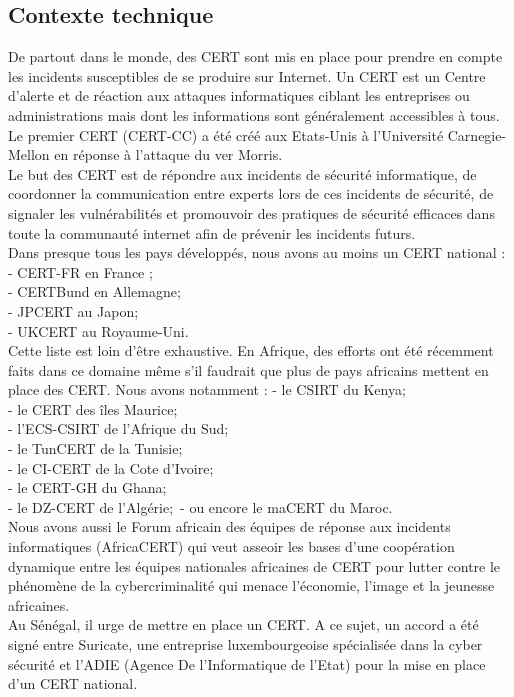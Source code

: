 \subsection{Contexte technique}
De partout dans le monde, des CERT sont mis en place pour prendre en compte les incidents susceptibles de se produire sur Internet. Un CERT est un Centre d’alerte et de réaction aux attaques informatiques ciblant les entreprises ou administrations mais dont les informations sont généralement accessibles à tous. Le premier CERT (CERT-CC) a été créé aux Etats-Unis à l’Université Carnegie-Mellon en réponse à l’attaque du ver Morris. \\
Le but des CERT est de répondre aux incidents de sécurité informatique, de coordonner la communication entre experts lors de ces incidents de sécurité, de signaler les vulnérabilités et promouvoir des pratiques de sécurité efficaces dans toute la communauté internet afin de prévenir les incidents futurs. \\
Dans presque tous les pays développés, nous avons au moins un CERT national : \\
- CERT-FR en France ; \\
- CERTBund en Allemagne; \\ 
- JPCERT au Japon; \\
- UKCERT au Royaume-Uni.\\
Cette liste est loin d'être exhaustive.
En Afrique, des efforts ont été récemment faits  dans ce domaine même s’il faudrait que plus de pays africains mettent en place des CERT. Nous avons notamment :
- le CSIRT du Kenya;\\
- le CERT des îles Maurice;\\
- l’ECS-CSIRT de l’Afrique du Sud;\\
- le TunCERT de la Tunisie;\\
- le CI-CERT de la Cote d’Ivoire;\\
- le CERT-GH du Ghana;\\
- le DZ-CERT de l’Algérie;\
- ou encore le maCERT du Maroc. \\ 
Nous avons aussi le Forum africain des équipes de réponse aux incidents informatiques (AfricaCERT) qui veut asseoir les bases d’une coopération dynamique entre les équipes nationales africaines de CERT pour lutter contre le phénomène de la cybercriminalité qui menace l’économie, l’image et la jeunesse africaines.\\
Au Sénégal, il urge de mettre en place un CERT. A ce sujet, un accord a été signé entre Suricate, une entreprise luxembourgeoise spécialisée dans la cyber sécurité et l'ADIE (Agence De l'Informatique de l'Etat) pour la mise en place d'un CERT national. \nomenclature{ADIE}{Agence De l'Informatique de l'Etat}\\
